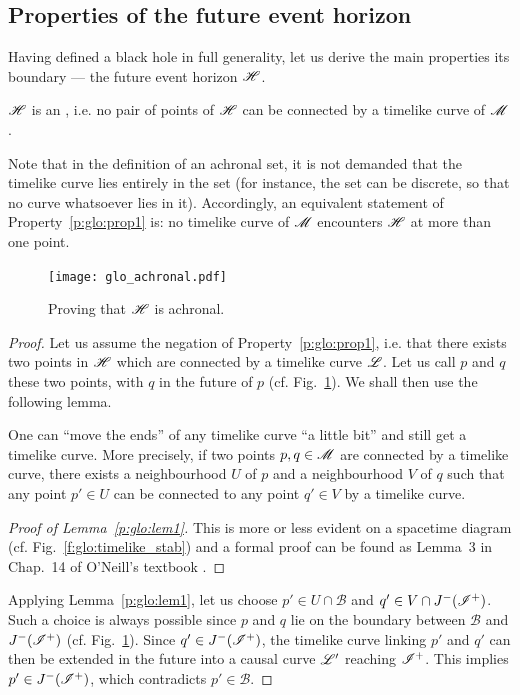 \subsection{Properties of the future event horizon} \label{s:glo:properties_H}

Having defined a black hole in full generality, let us derive the
main properties its boundary --- the future event horizon $\mathscr{H}$.

\begin{prop}
\label{p:glo:prop1}
$\mathscr{H}$ is an , i.e. no pair of points of $\mathscr{H}$ can be connected
by a timelike curve of $\mathscr{M}$.
\end{prop}

Note that in the definition of an achronal set, it is not demanded that the timelike
curve lies entirely in the set (for instance, the set can be discrete, so that no curve
whatsoever lies in it). Accordingly,
an equivalent statement of Property~\ref{p:glo:prop1} is: no timelike curve of $\mathscr{M}$
encounters $\mathscr{H}$ at more than one point.

\begin{figure}
\centerline{\texttt{[image: glo\_achronal.pdf]}}
\caption[]{\label{f:glo:achronal} \footnotesize
Proving that $\mathscr{H}$ is achronal.}
\end{figure}

\begin{proof}
Let us assume the negation of Property~\ref{p:glo:prop1}, i.e. that there exists two points
in $\mathscr{H}$ which are connected by a timelike curve $\mathscr{L}$. Let us call $p$ and
$q$ these two points, with $q$ in the future of $p$ (cf. Fig.~\ref{f:glo:achronal}).
We shall then use the following lemma.
\begin{lemma}
\label{p:glo:lem1}
One can ``move the ends'' of any timelike curve
``a little bit'' and still get a timelike curve. More precisely,
if two points $p,q\in\mathscr{M}$ are connected by a timelike curve,
there exists
a neighbourhood $U$ of $p$ and a neighbourhood $V$ of $q$ such that
any point $p'\in U$ can be connected to any point $q'\in V$ by a timelike curve.
\end{lemma}
\begin{proof}[Proof of Lemma~\ref{p:glo:lem1}]
This is more or less evident on a spacetime diagram (cf. Fig.~\ref{f:glo:timelike_stab})
and a formal proof
can be found as Lemma~3 in Chap.~14 of O'Neill's textbook \cite{ONeil83}.
\end{proof}
Applying Lemma~\ref{p:glo:lem1},
let us choose $p'\in U\cap\mathscr{B}$ and $q'\in V\cap J^-(\mathscr{I}^+)$. Such a choice is
always possible since $p$ and $q$ lie on the boundary between $\mathscr{B}$
and $J^-(\mathscr{I}^+)$ (cf. Fig.~\ref{f:glo:achronal}).
Since $q'\in J^-(\mathscr{I}^+)$, the timelike curve linking $p'$ and $q'$ can then be extended in the future into a causal curve $\mathscr{L}'$ reaching $\mathscr{I}^+$. This implies $p'\in J^-(\mathscr{I}^+)$,
which contradicts $p'\in\mathscr{B}$.
\end{proof}

